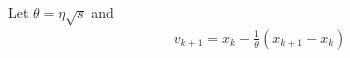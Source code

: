 \documentclass[12pt,english]{article}
\begin{document}
\begin{lemma}\label{lemma:}
Let $\theta= \eta\sqrt{s}$ and 
%
\begin{align*}
v_{k+1} = x_k - \frac{1}{\theta} (x_{k+1} -x_{k})
\end{align*}
%

\end{lemma}
%


\printbibliography
%
\end{document}
